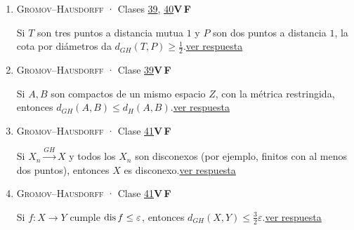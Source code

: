 \documentclass[11pt,a4paper]{article}
\begin{document}
\begin{enumerate}[leftmargin=2.2em,itemsep=8pt,label=\textbf{\arabic*.}]
\item[\hyperlink{r-27}{\textbf{27.}}] \hypertarget{q-27}{}{\small \textsc{Gromov–Hausdorff} · Clases \href{https://decostruttivismo.github.io/MAT2514-repaso/pdf/MAT2514_apuntes_completos.pdf\#nameddest=section.39}{39}, \href{https://decostruttivismo.github.io/MAT2514-repaso/pdf/MAT2514_apuntes_completos.pdf\#nameddest=section.40}{40}}\hfill \textbf{V}\,\fbox{\rule{0pt}{6pt}\hspace{6pt}}\quad\textbf{F}\,\fbox{\rule{0pt}{6pt}\hspace{6pt}}\par Si $T$ son tres puntos a distancia mutua $1$ y $P$ son dos puntos a distancia $1$, la cota por diámetros da $d_{GH}(T,P)\ge\frac12$.\hfill{\footnotesize\hyperlink{r-27}{ver respuesta}}
\item[\hyperlink{r-28}{\textbf{28.}}] \hypertarget{q-28}{}{\small \textsc{Gromov–Hausdorff} · Clase \href{https://decostruttivismo.github.io/MAT2514-repaso/pdf/MAT2514_apuntes_completos.pdf\#nameddest=section.39}{39}}\hfill \textbf{V}\,\fbox{\rule{0pt}{6pt}\hspace{6pt}}\quad\textbf{F}\,\fbox{\rule{0pt}{6pt}\hspace{6pt}}\par Si $A,B$ son compactos de un mismo espacio $Z$, con la métrica restringida, entonces $d_{GH}(A,B)\le d_H(A,B)$.\hfill{\footnotesize\hyperlink{r-28}{ver respuesta}}
\item[\hyperlink{r-29}{\textbf{29.}}] \hypertarget{q-29}{}{\small \textsc{Gromov–Hausdorff} · Clase \href{https://decostruttivismo.github.io/MAT2514-repaso/pdf/MAT2514_apuntes_completos.pdf\#nameddest=section.41}{41}}\hfill \textbf{V}\,\fbox{\rule{0pt}{6pt}\hspace{6pt}}\quad\textbf{F}\,\fbox{\rule{0pt}{6pt}\hspace{6pt}}\par Si $X_n\xrightarrow{GH}X$ y todos los $X_n$ son disconexos (por ejemplo, finitos con al menos dos puntos), entonces $X$ es disconexo.\hfill{\footnotesize\hyperlink{r-29}{ver respuesta}}
\item[\hyperlink{r-30}{\textbf{30.}}] \hypertarget{q-30}{}{\small \textsc{Gromov–Hausdorff} · Clase \href{https://decostruttivismo.github.io/MAT2514-repaso/pdf/MAT2514_apuntes_completos.pdf\#nameddest=section.41}{41}}\hfill \textbf{V}\,\fbox{\rule{0pt}{6pt}\hspace{6pt}}\quad\textbf{F}\,\fbox{\rule{0pt}{6pt}\hspace{6pt}}\par Si $f\colon X\to Y$ cumple $\operatorname{dis} f\le\varepsilon$, entonces $d_{GH}(X,Y)\le\frac32\varepsilon$.\hfill{\footnotesize\hyperlink{r-30}{ver respuesta}}

\end{enumerate}
\end{document}
